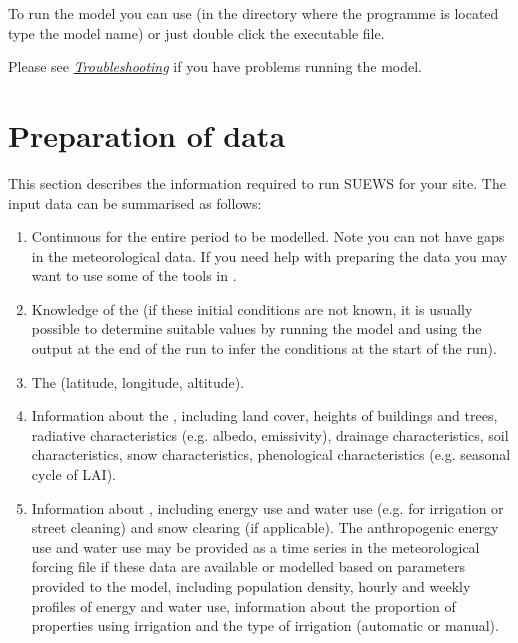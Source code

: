 \documentclass[letterpaper,10pt,english]{sphinxmanual}
\begin{document}
To run the model you can use  (in the directory where
the programme is located type the model name) or just double click the
executable file.

Please see {\hyperref[\detokenize{prepare-to-run-the-model:Troubleshooting}]{\emph{Troubleshooting}}} if you have problems
running the model.


\section{Preparation of data}
\label{\detokenize{prepare-to-run-the-model:preparation-of-data}}
This section describes the information required to run SUEWS for your
site. The input data can be summarised as follows:
\begin{enumerate}
\item {} 
Continuous  for the entire period to be
modelled. Note you can not have gaps in the meteorological data. If
you need help with preparing the data you may want to use some of the
tools in
.

\item {} 
Knowledge of the  (if these initial conditions are not known, it is
usually possible to determine suitable values by running the model
and using the output at the end of the run to infer the conditions at
the start of the run).

\item {} 
The  (latitude, longitude, altitude).

\item {} 
Information about the , including
land cover, heights of buildings and trees, radiative characteristics
(e.g. albedo, emissivity), drainage characteristics, soil
characteristics, snow characteristics, phenological characteristics
(e.g. seasonal cycle of LAI).

\item {} 
Information about , including energy use and water
use (e.g. for irrigation or street cleaning) and snow clearing (if
applicable). The anthropogenic energy use and water use may be
provided as a time series in the meteorological forcing file if these
data are available or modelled based on parameters provided to the
model, including population density, hourly and weekly profiles of
energy and water use, information about the proportion of properties
using irrigation and the type of irrigation (automatic or manual).

\end{enumerate}
\end{document}
